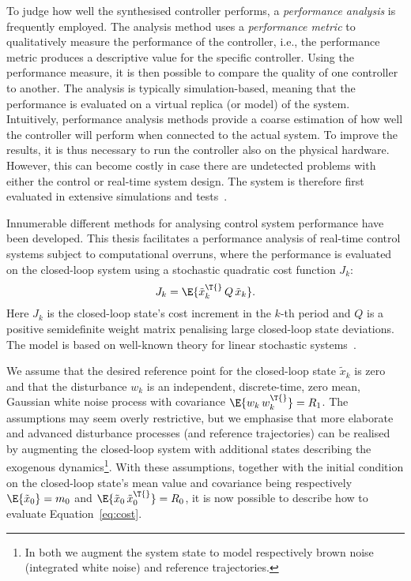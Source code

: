To judge how well the synthesised controller performs, a \emph{performance analysis} is frequently employed.
The analysis method uses a \emph{performance metric} to qualitatively measure the performance of the controller, i.e., the performance metric produces a descriptive value for the specific controller.
Using the performance measure, it is then possible to compare the quality of one controller to another.
The analysis is typically simulation-based, meaning that the performance is evaluated on a virtual replica (or model) of the system.
Intuitively, performance analysis methods provide a coarse estimation of how well the controller will perform when connected to the actual system.
To improve the results, it is thus necessary to run the controller also on the physical hardware.
However, this can become costly in case there are undetected problems with either the control or real-time system design.
The system is therefore first evaluated in extensive simulations and tests~\cite{Mandrioli:2022}.

Innumerable different methods for analysing control system performance have been developed.
This thesis facilitates a performance analysis of real-time control systems subject to computational overruns, where the performance is evaluated on the closed-loop system using a stochastic quadratic cost function $J_k$:
%
\begin{equation}%
    \label{eq:cost}%
    J_k = \E{\tilde{x}_k^\T{}\, Q\, \tilde{x}_k}.
\end{equation}
%
Here $J_k$ is the closed-loop state's cost increment in the $k$-th period and $Q$ is a positive semidefinite weight matrix penalising large closed-loop state deviations.
The model is based on well-known theory for linear stochastic systems~\cite{Astrom:1970, Astrom:1997, Cervin:2019}.

We assume that the desired reference point for the closed-loop state $\tilde{x}_k$ is zero and that the disturbance $w_k$ is an independent, discrete-time, zero mean, Gaussian white noise process with covariance $\E{w_k\,w_k^\T{}} = R_1$.
The assumptions may seem overly restrictive, but we emphasise that more elaborate and advanced disturbance processes (and reference trajectories) can be realised by augmenting the closed-loop system with additional states describing the exogenous dynamics\footnote{In both  we augment the system state to model respectively brown noise (integrated white noise) and reference trajectories.}.
With these assumptions, together with the initial condition on the closed-loop state's mean value and covariance being respectively $\E{\tilde{x}_0} = m_0$ and $\E{\tilde{x}_0\,\tilde{x}_0^\T{}} = R_0$, it is now possible to describe how to evaluate Equation~\eqref{eq:cost}.

